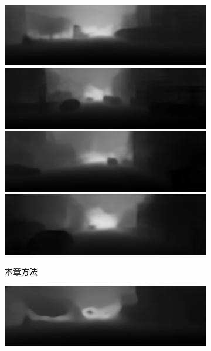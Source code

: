 \begin{figure}[htb]
\begin{subfigure}{0.24\linewidth}
\begin{minipage}[b]{1\linewidth}
  \includegraphics[width=1\linewidth]{figure/Pixel_cla_kitti/1res.png}\vspace{4pt}
  \includegraphics[width=1\linewidth]{figure/Pixel_cla_kitti/2res.png}\vspace{4pt}
  \includegraphics[width=1\linewidth]{figure/Pixel_cla_kitti/3res.png}\vspace{4pt}
  \includegraphics[width=1\linewidth]{figure/Pixel_cla_kitti/4res.png}
  \end{minipage}
  \caption{本章方法}
  \end{subfigure}
  \begin{subfigure}{0.24\linewidth}
  \begin{minipage}[b]{1\linewidth}
  \includegraphics[width=1\linewidth]{figure/Pixel_cla_kitti/1eigen.png}\vspace{3.5pt}

\end{minipage}
\end{subfigure}
\end{figure}
